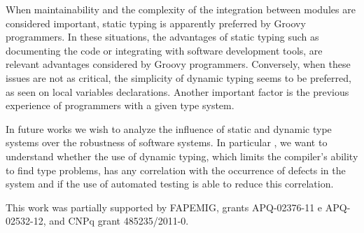 \documentclass[preprint]{sigplanconf}
\begin{document}
When maintainability and the complexity of the integration between modules are considered important, static typing is apparently preferred by Groovy programmers. 
In these situations, the advantages of static typing such as documenting the code or integrating with software development tools, are relevant advantages considered by Groovy programmers.
Conversely, when these issues are not as critical, the simplicity of dynamic typing seems to be preferred, as seen on local variables declarations.
Another important factor is the previous experience of programmers with a given type system.

In future works we wish to analyze the influence of static and dynamic type systems over the robustness of software systems.
In particular , we want to understand whether the use of dynamic typing, which limits the compiler's ability to find type problems, has any correlation with the occurrence of defects in the system and if the use of automated testing is able to reduce this correlation.

\acks
This work was partially supported by FAPEMIG, grants APQ-02376-11 e APQ-02532-12, and CNPq grant 485235/2011-0. 




\end{document}
